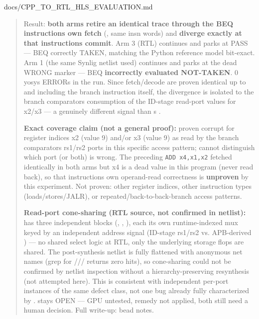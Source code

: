 \begin{relocated}{docs/CPP_TO_RTL_HLS_EVALUATION.md}
\begin{quote}
Result: \textbf{both arms retire an identical trace through the BEQ
instruction\textquotesingle s own fetch}
(, same insn words) and \textbf{diverge
exactly at that instruction\textquotesingle s commit}. Arm 3 (RTL)
continues  and parks at PASS --- BEQ correctly
TAKEN, matching the Python reference model bit-exact. Arm 1 (the same
Synlig netlist  used) continues  and
parks at the dead WRONG marker --- BEQ \textbf{incorrectly evaluated
NOT-TAKEN}. 0 yosys ERRORs in the run. Since fetch/\allowbreak{}decode
are proven identical up to and including the branch instruction itself,
the divergence is isolated to the branch comparator\textquotesingle s
consumption of the ID-stage read-port values for x2/x3 --- a genuinely
different signal than \textquotesingle s .

\textbf{Exact coverage claim (not a general proof):} proven corrupt for
register indices x2 (value 9) and/or x3 (value 9) as read by the branch
comparator\textquotesingle s rs1/rs2 ports in this specific access
pattern; cannot distinguish which port (or both) is wrong. The preceding
\texttt{ADD\ x4,\allowbreak{}x1,\allowbreak{}x2} fetched identically in
both arms but x4 is a dead value in this program (never read back), so
that instruction\textquotesingle s own operand-read correctness is
\textbf{unproven} by this experiment. Not proven: other register
indices, other instruction types
(loads/\allowbreak{}stores/\allowbreak{}JALR), or
repeated/\allowbreak{}back-to-back-branch access patterns.

\textbf{Read-port cone-sharing (RTL source, not confirmed in netlist):}
 has three independent  blocks
(, , ), each its own
runtime-indexed mux keyed by an independent address signal (ID-stage
rs1/rs2 vs. APB-derived ) --- no shared select logic
at RTL, only the underlying storage flops are shared. The post-synthesis
netlist is fully flattened with anonymous net names (grep for
///
returns zero hits), so cone-sharing could not be confirmed by netlist
inspection without a hierarchy-preserving resynthesis (not attempted
here). This is consistent with independent per-port instances of the
same  defect class, not one bug already fully
characterized by .  stays OPEN --- GPU untested,
remedy not applied, both still need a human decision. Full write-up:
bead  notes.
\end{quote}


\end{relocated}
